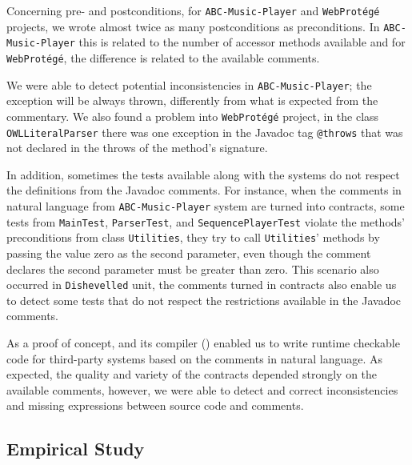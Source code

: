 Concerning pre- and postconditions, for \texttt{ABC-Music-Player} and
\texttt{WebProt\'{e}g\'{e}} projects, we wrote almost twice as many postconditions
as preconditions.
In \texttt{ABC-Music-Player} this is related to the number of accessor methods
available and for \texttt{WebProt\'{e}g\'{e}}, the difference is related to
the available comments.
%


We were able to detect potential inconsistencies in \texttt{ABC-Mu\-sic-Player};
the exception will be always thrown, differently from what is expected from the
commentary.
We also found a problem into
\texttt{WebProt\'{e}g\'{e}} project, in the class \texttt{OWLLiteralParser} there was one exception
in the Javadoc tag \texttt{@throws} that was not declared in the throws of the method's signature.

In addition, sometimes the tests available along with the systems do
not respect the definitions from the Javadoc comments. For instance, when the
comments in natural language from \texttt{ABC-Music-Player} system are turned into
\contractjdoc{} contracts, some tests from
\texttt{MainTest}, \texttt{ParserTest}, and \texttt{SequencePlayerTest} violate
the methods' preconditions from class \texttt{Utilities}, they try to
call \texttt{Utilities}' methods by passing the value zero as the second
parameter, even though the comment declares the second parameter must be greater than zero.
This scenario also occurred in \texttt{Dishevelled} unit, the comments turned
in \contractjdoc{} contracts also enable us to detect some tests
that do not respect the restrictions available in the Javadoc comments.

As a proof of concept, \contractjdoc{} and its compiler (\contractjdocCompiler{}) enabled us to write runtime
checkable code for third-party systems based on the comments in natural
language.
As expected, the quality and variety of the contracts depended strongly on the available comments, however, we were able to
detect and correct inconsistencies and missing expressions between source code and comments.




\subsection{Empirical Study}
\label{sec:expResults}

